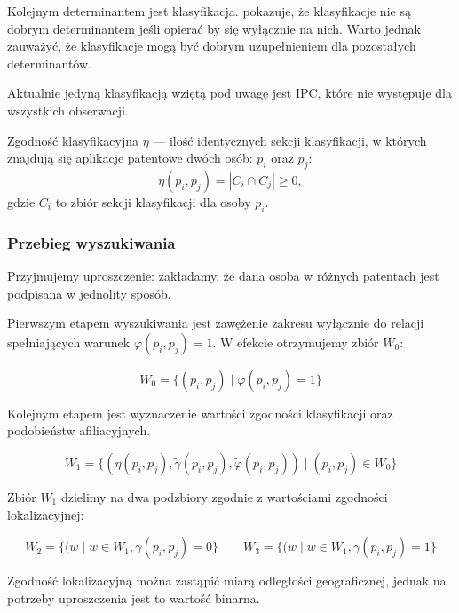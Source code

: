 Kolejnym determinantem jest klasyfikacja. 
pokazuje, że klasyfikacje nie są dobrym determinantem jeśli opierać by się wyłącznie 
na nich. Warto jednak zauważyć, że klasyfikacje mogą być dobrym uzupełnieniem
dla pozostałych determinantów.

\begin{uwaga}
Aktualnie jedyną klasyfikacją wziętą pod uwagę jest \ac{IPC}, które
nie występuje dla wszystkich obserwacji.
\end{uwaga}

\begin{defi}\label{defi:zgodność-clsf}
Zgodność klasyfikacyjna $\eta$ --- ilość identycznych sekcji klasyfikacji,
w których znajdują się aplikacje patentowe dwóch osób: $p_i$ oraz $p_j$:
$$\eta(p_i, p_j) = | C_i \cap C_j | \ge 0,$$
gdzie $C_i$ to zbiór sekcji klasyfikacji dla osoby $p_i$.
\end{defi}

\subsubsection{Przebieg wyszukiwania}

\begin{uwaga}
Przyjmujemy uproszczenie: zakładamy, że dana osoba w różnych patentach 
jest podpisana w jednolity sposób.
\end{uwaga}

Pierwszym etapem wyszukiwania jest zawężenie zakresu wyłącznie do relacji
spełniających warunek $\varphi(p_i, p_j) = 1$.
W efekcie otrzymujemy zbiór $W_0$:

$$W_0 = \{ (p_i, p_j)\mid \varphi(p_i, p_j) = 1 \}$$

Kolejnym etapem jest wyznaczenie wartości zgodności klasyfikacji oraz 
podobieństw afiliacyjnych.

$$W_1 = \{ ( \eta(p_i, p_j), \tilde \gamma(p_i, p_j), \tilde \varphi(p_i, p_j) ) \mid (p_i, p_j) \in W_0 \}$$

Zbiór $W_1$ dzielimy na dwa podzbiory zgodnie z wartościami zgodności lokalizacyjnej:

$$
W_2 = \{ ( w \mid w \in W_1, \gamma(p_i, p_j) = 0 \}\qquad 
W_3 = \{ ( w \mid w \in W_1, \gamma(p_i, p_j) = 1 \}
$$

\begin{uwaga}
Zgodność lokalizacyjną można zastąpić miarą odległości geograficznej,
jednak na potrzeby uproszczenia jest to wartość binarna.
\end{uwaga}

